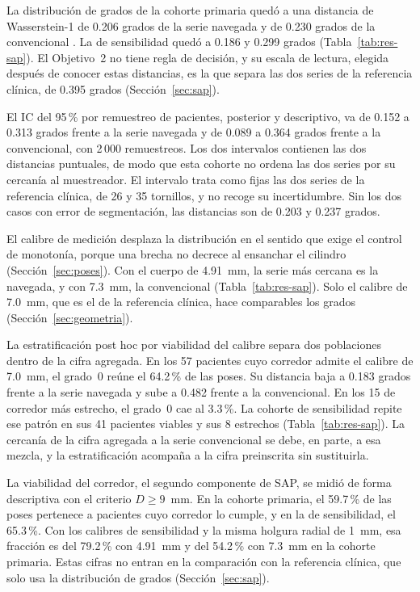 La distribución de grados de la cohorte primaria quedó a una distancia de Wasserstein-1 de 0.206 grados de la serie navegada y de 0.230 grados de la convencional \cite{zwingmann2009navigated}. La de sensibilidad quedó a 0.186 y 0.299 grados (Tabla~\ref{tab:res-sap}). El Objetivo~2 no tiene regla de decisión, y su escala de lectura, elegida después de conocer estas distancias, es la que separa las dos series de la referencia clínica, de 0.395 grados (Sección~\ref{sec:sap}).

El IC del 95\,\% por remuestreo de pacientes, posterior y descriptivo, va de 0.152 a 0.313 grados frente a la serie navegada y de 0.089 a 0.364 grados frente a la convencional, con 2\,000 remuestreos. Los dos intervalos contienen las dos distancias puntuales, de modo que esta cohorte no ordena las dos series por su cercanía al muestreador. El intervalo trata como fijas las dos series de la referencia clínica, de 26 y 35 tornillos, y no recoge su incertidumbre. Sin los dos casos con error de segmentación, las distancias son de 0.203 y 0.237 grados.

El calibre de medición desplaza la distribución en el sentido que exige el control de monotonía, porque una brecha no decrece al ensanchar el cilindro (Sección~\ref{sec:poses}). Con el cuerpo de 4.91~mm, la serie más cercana es la navegada, y con 7.3~mm, la convencional (Tabla~\ref{tab:res-sap}). Solo el calibre de 7.0~mm, que es el de la referencia clínica, hace comparables los grados (Sección~\ref{sec:geometria}).

La estratificación post hoc por viabilidad del calibre separa dos poblaciones dentro de la cifra agregada. En los 57 pacientes cuyo corredor admite el calibre de 7.0~mm, el grado~0 reúne el 64.2\,\% de las poses. Su distancia baja a 0.183 grados frente a la serie navegada y sube a 0.482 frente a la convencional. En los 15 de corredor más estrecho, el grado~0 cae al 3.3\,\%. La cohorte de sensibilidad repite ese patrón en sus 41 pacientes viables y sus 8 estrechos (Tabla~\ref{tab:res-sap}). La cercanía de la cifra agregada a la serie convencional se debe, en parte, a esa mezcla, y la estratificación acompaña a la cifra preinscrita sin sustituirla.

La viabilidad del corredor, el segundo componente de SAP, se midió de forma descriptiva con el criterio $D \geq 9$~mm. En la cohorte primaria, el 59.7\,\% de las poses pertenece a pacientes cuyo corredor lo cumple, y en la de sensibilidad, el 65.3\,\%. Con los calibres de sensibilidad y la misma holgura radial de 1~mm, esa fracción es del 79.2\,\% con 4.91~mm y del 54.2\,\% con 7.3~mm en la cohorte primaria. Estas cifras no entran en la comparación con la referencia clínica, que solo usa la distribución de grados (Sección~\ref{sec:sap}).

